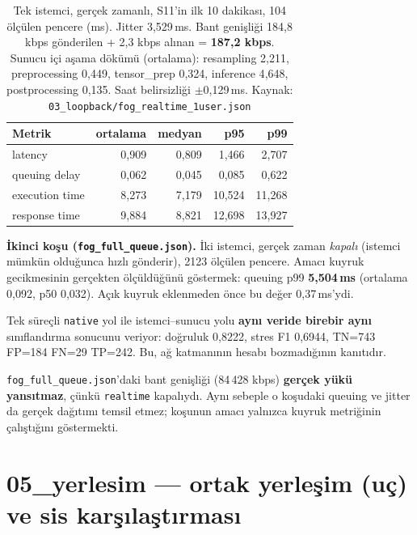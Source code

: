 \documentclass[11pt,a4paper]{report}
\newcommand{\ms}{\,ms}
\newcommand{\kod}[1]{\texttt{\small #1}}
\newcommand{\dosya}[1]{\texttt{\footnotesize #1}}
\begin{document}
\begin{table}[H]
\centering\small
\begin{tabular}{@{}lrrrr@{}}
\toprule
\textbf{Metrik} & \textbf{ortalama} & \textbf{medyan} & \textbf{p95} & \textbf{p99} \\
\midrule
latency        & 0{,}909 & 0{,}809 & 1{,}466 & 2{,}707 \\
queuing delay  & 0{,}062 & 0{,}045 & 0{,}085 & 0{,}622 \\
execution time & 8{,}273 & 7{,}179 & 10{,}524 & 11{,}268 \\
response time  & 9{,}884 & 8{,}821 & 12{,}698 & 13{,}927 \\
\bottomrule
\end{tabular}
\caption{Tek istemci, gerçek zamanlı, S11'in ilk 10 dakikası, 104 ölçülen
pencere (ms). Jitter 3{,}529\ms. Bant genişliği 184{,}8 kbps gönderilen +
2{,}3 kbps alınan = \textbf{187{,}2 kbps}. Sunucu içi aşama dökümü (ortalama):
resampling 2{,}211, preprocessing 0{,}449, tensor\_prep 0{,}324, inference
4{,}648, postprocessing 0{,}135. Saat belirsizliği $\pm$0{,}129\ms.
Kaynak: \dosya{03\_loopback/fog\_realtime\_1user.json}}
\end{table}

\textbf{İkinci koşu (\dosya{fog\_full\_queue.json}).} İki istemci, gerçek zaman
\emph{kapalı} (istemci mümkün olduğunca hızlı gönderir), 2123 ölçülen pencere.
Amacı kuyruk gecikmesinin gerçekten ölçüldüğünü göstermek: queuing p99
\textbf{5{,}504\ms} (ortalama 0{,}092, p50 0{,}032). Açık kuyruk eklenmeden
önce bu değer 0{,}37\ms'ydi.

\begin{bulgu}[Doğrulama]
Tek süreçli \kod{native} yol ile istemci--sunucu yolu \textbf{aynı veride birebir
aynı} sınıflandırma sonucunu veriyor: doğruluk 0{,}8222, stres F1 0{,}6944,
TN=743 FP=184 FN=29 TP=242. Bu, ağ katmanının hesabı bozmadığının kanıtıdır.
\end{bulgu}

\begin{uyari}
\dosya{fog\_full\_queue.json}'daki bant genişliği (84\,428 kbps) \textbf{gerçek
yükü yansıtmaz}, çünkü \kod{realtime} kapalıydı. Aynı sebeple o koşudaki
queuing ve jitter da gerçek dağıtımı temsil etmez; koşunun amacı yalnızca
kuyruk metriğinin çalıştığını göstermekti.
\end{uyari}

\section{05\_yerlesim --- ortak yerleşim (uç) ve sis karşılaştırması}
\end{document}
